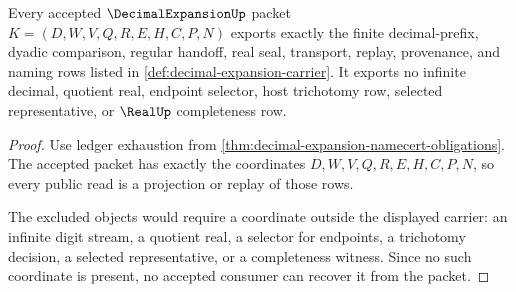 \begin{theorem}
\label{thm:decimal-expansion-nonescape}
Every accepted $\DecimalExpansionUp$ packet $K=(D,W,V,Q,R,E,H,C,P,N)$ exports exactly the finite decimal-prefix, dyadic comparison, regular handoff, real seal, transport, replay, provenance, and naming rows listed in \autoref{def:decimal-expansion-carrier}. It exports no infinite decimal, quotient real, endpoint selector, host trichotomy row, selected representative, or $\RealUp$ completeness row.
\end{theorem}
\begin{proof}
Use ledger exhaustion from \autoref{thm:decimal-expansion-namecert-obligations}. The accepted packet has exactly the coordinates $D,W,V,Q,R,E,H,C,P,N$, so every public read is a projection or replay of those rows.

The excluded objects would require a coordinate outside the displayed carrier: an infinite digit stream, a quotient real, a selector for endpoints, a trichotomy decision, a selected representative, or a completeness witness. Since no such coordinate is present, no accepted consumer can recover it from the packet.
\end{proof}

